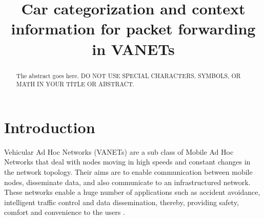 \documentclass[conference]{IEEEtran}
\begin{document}
\title{Car categorization and context information for packet forwarding in VANETs}


\author{
}

\maketitle

\begin{abstract}
The abstract goes here. DO NOT USE SPECIAL CHARACTERS, SYMBOLS, OR MATH IN YOUR TITLE OR ABSTRACT.

\end{abstract}



%
\IEEEpeerreviewmaketitle

\section{Introduction}
Vehicular Ad Hoc Networks (VANETs) are a sub class of Mobile Ad Hoc Networks that deal with nodes moving in high speeds and constant changes in the network topology. Their aims are to enable communication between mobile nodes, disseminate data, and also communicate to an infrastructured network. These networks enable a huge number of applications such as accident avoidance, intelligent traffic control and data dissemination, thereby, providing safety, comfort and convenience to the users \cite{conprova2013}. 
\end{document}
